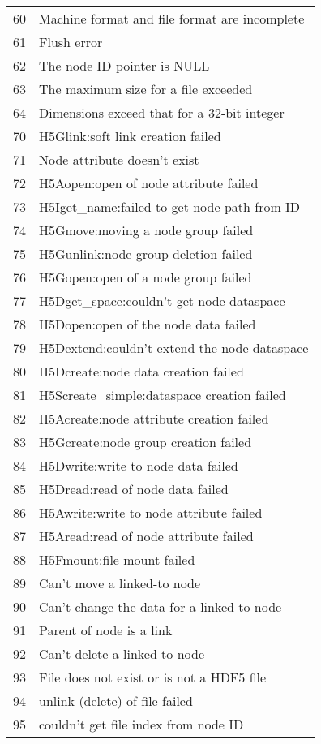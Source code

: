 \begin{longtable}{c >{\raggedright\arraybackslash}p{\Pwidth}}
60  & Machine format and file format are incomplete \\
61  & Flush error \\
62  & The node ID pointer is NULL \\
63  & The maximum size for a file exceeded \\
64  & Dimensions exceed that for a 32-bit integer \\
70  & H5Glink:soft link creation failed \\
71  & Node attribute doesn't exist \\
72  & H5Aopen:open of node attribute failed \\
73  & H5Iget\_name:failed to get node path from ID \\
74  & H5Gmove:moving a node group failed \\
75  & H5Gunlink:node group deletion failed \\
76  & H5Gopen:open of a node group failed \\
77  & H5Dget\_space:couldn't get node dataspace \\
78  & H5Dopen:open of the node data failed \\
79  & H5Dextend:couldn't extend the node dataspace \\
80  & H5Dcreate:node data creation failed \\
81  & H5Screate\_simple:dataspace creation failed \\
82  & H5Acreate:node attribute creation failed \\
83  & H5Gcreate:node group creation failed \\
84  & H5Dwrite:write to node data failed \\
85  & H5Dread:read of node data failed \\
86  & H5Awrite:write to node attribute failed \\
87  & H5Aread:read of node attribute failed \\
88  & H5Fmount:file mount failed \\
89  & Can't move a linked-to node \\
90  & Can't change the data for a linked-to node \\
91  & Parent of node is a link \\
92  & Can't delete a linked-to node \\
93  & File does not exist or is not a HDF5 file \\
94  & unlink (delete) of file failed \\
95  & couldn't get file index from node ID \\

\end{longtable}
